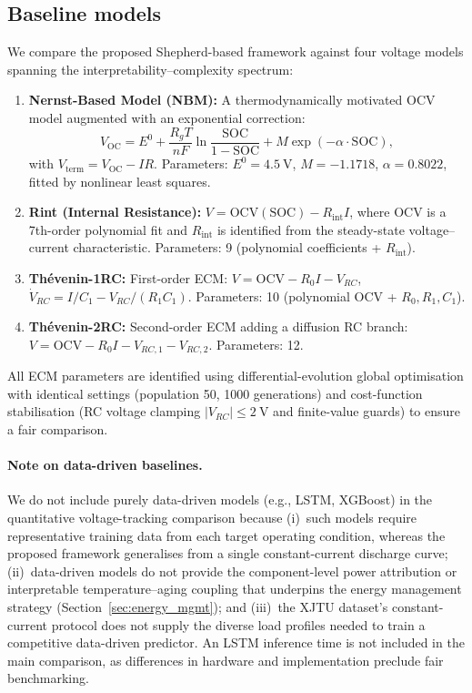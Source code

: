 \documentclass[5p,times,number]{elsarticle}
\newcommand{\secref}[1]{\textcolor{supercolor}{Section~\ref{#1}}}
\begin{document}
\subsection{Baseline models}\label{sec:baselines}
We compare the proposed Shepherd-based framework against four voltage models spanning the interpretability--complexity spectrum:
\begin{enumerate}\renewcommand{\labelenumi}{(\roman{enumi})}
    \item \textbf{Nernst-Based Model (NBM):}
    A thermodynamically motivated OCV model augmented with an exponential correction:
    \begin{equation}\label{eq:nbm}
    V_{\mathrm{OC}} = E^0 + \frac{R_g T}{nF}\ln\!\frac{\mathrm{SOC}}{1-\mathrm{SOC}} + M\exp(-\alpha\cdot\mathrm{SOC}),
    \end{equation}
    with $V_{\mathrm{term}} = V_{\mathrm{OC}} - IR$.  Parameters: $E^0 = \SI{4.5}{\volt}$, $M = -1.1718$, $\alpha = 0.8022$, fitted by nonlinear least squares.
    \item \textbf{Rint (Internal Resistance):}
    $V = \mathrm{OCV}(\mathrm{SOC}) - R_{\mathrm{int}} I$, where OCV is a 7th-order polynomial fit and $R_{\mathrm{int}}$ is identified from the steady-state voltage--current characteristic.  Parameters: 9 (polynomial coefficients + $R_{\mathrm{int}}$).
    \item \textbf{Th\'{e}venin-1RC:}
    First-order ECM: $V = \mathrm{OCV} - R_0 I - V_{RC}$, $\dot{V}_{RC} = I/C_1 - V_{RC}/(R_1 C_1)$.  Parameters: 10 (polynomial OCV + $R_0, R_1, C_1$).
    \item \textbf{Th\'{e}venin-2RC:}
    Second-order ECM adding a diffusion RC branch: $V = \mathrm{OCV} - R_0 I - V_{RC,1} - V_{RC,2}$.  Parameters: 12.
\end{enumerate}
All ECM parameters are identified using differential-evolution global optimisation with identical settings (population 50, 1000 generations) and cost-function stabilisation (RC voltage clamping $|V_{RC}| \le \SI{2}{\volt}$ and finite-value guards) to ensure a fair comparison.

\paragraph{Note on data-driven baselines.}
We do not include purely data-driven models (e.g., LSTM, XGBoost) in the quantitative voltage-tracking comparison because (i)~such models require representative training data from each target operating condition, whereas the proposed framework generalises from a single constant-current discharge curve; (ii)~data-driven models do not provide the component-level power attribution or interpretable temperature--aging coupling that underpins the energy management strategy (\secref{sec:energy_mgmt}); and (iii)~the XJTU dataset's constant-current protocol does not supply the diverse load profiles needed to train a competitive data-driven predictor.
An LSTM inference time is not included in the main comparison, as differences in hardware and implementation preclude fair benchmarking.
\end{document}
